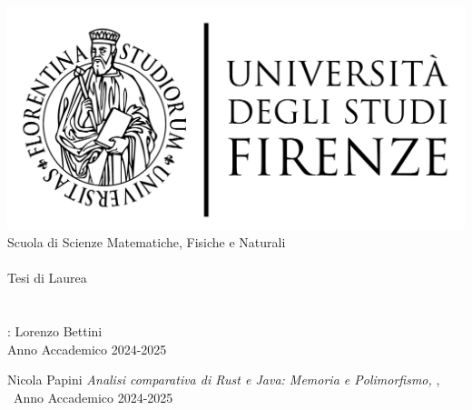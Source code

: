 \newcommand{\myFaculty}{
	Scuola di Scienze Matematiche, Fisiche e Naturali\xspace}
\newcommand{\myUni}{\protect{
	Università degli Studi di Firenze}\xspace}

\begin{titlepage}
	\begin{center}
   	\large
      \hfill
      \vfill
      \begingroup
         \includegraphics[scale=0.15]{logo/LOGO}\\
			\myFaculty \\
			\myDegree \\ 
			\vspace{0.5cm}
         \vspace{0.5cm}    
         Tesi di Laurea    
         \vspace{0.5cm}    
      \endgroup 
      \vfill 
      \begingroup
      	\color{Maroon} \\ $\ $\\
      	 \\ 	
	\bigskip
	\bigskip
      \endgroup
      \vfill 
      \vfill
      \mySupervisorTitle: Lorenzo Bettini\\
      \vfill
	\bigskip
	\bigskip
      \vfill
      \vfill
      \vfill
      \vfill
      \vfill
      \vfill
      \vfill
      \vfill
      Anno Accademico 2024-2025
	\end{center}        
\end{titlepage}   
   \newpage
	\thispagestyle{empty}
	\hfill
	\vfill
	\noindent Nicola Papini
	\textit{Analisi comparativa di Rust e Java: Memoria e Polimorfismo,} 
	\myDegree, \textcopyright\ Anno Accademico 2024-2025
